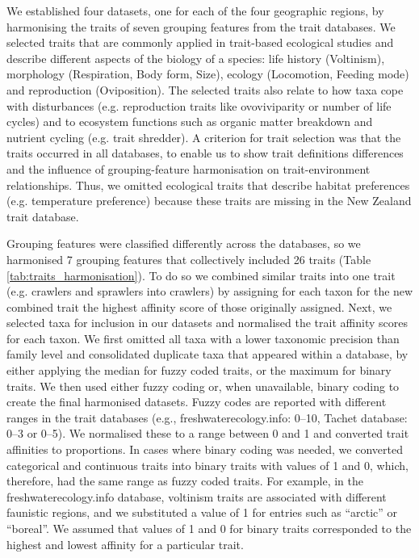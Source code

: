 \documentclass[12pt]{article}
\begin{document}
We established four datasets, one for each of the four geographic regions, by harmonising the traits of seven grouping features from the trait databases. We selected traits that are commonly applied in trait-based ecological studies and describe different aspects of the biology of a species: life history (Voltinism), morphology (Respiration, Body form, Size), ecology (Locomotion, Feeding mode) and reproduction (Oviposition). The selected traits also relate to how taxa cope with disturbances (e.g. reproduction traits like ovoviviparity or number of life cycles) and to ecosystem functions such as organic matter breakdown and nutrient cycling (e.g. trait shredder). A criterion for trait selection was that the traits occurred in all databases, to enable us to show trait definitions differences and the influence of grouping-feature harmonisation on trait-environment relationships. Thus, we omitted ecological traits that describe habitat preferences (e.g. temperature preference) because these traits are missing in the New Zealand trait database.

Grouping features were classified differently across the databases, so we harmonised 7 grouping features that collectively included 26 traits (Table \ref{tab:traits_harmonisation}). To do so we combined similar traits into one trait (e.g. crawlers and sprawlers into crawlers) by assigning for each taxon for the new combined trait the highest affinity score of those originally assigned. Next, we selected taxa for inclusion in our datasets and normalised the trait affinity scores for each taxon. We first omitted all taxa with a lower taxonomic precision than family level and consolidated duplicate taxa that appeared within a database, by either applying the median for fuzzy coded traits, or the maximum for binary traits. We then used either fuzzy coding or, when unavailable, binary coding to create the final harmonised datasets. Fuzzy codes are reported with different ranges in the trait databases (e.g., freshwaterecology.info: 0–10, Tachet database: 0–3 or 0–5). We normalised these to a range between 0 and 1 and converted trait affinities to proportions. In cases where binary coding was needed, we converted categorical and continuous traits into binary traits with values of 1 and 0, which, therefore, had the same range as fuzzy coded traits. For example, in the  freshwaterecology.info database, voltinism traits are associated with different faunistic regions, and we substituted a value of 1 for entries such as “arctic” or “boreal”. We assumed that values of 1 and 0 for binary traits corresponded to the highest and lowest affinity for a particular trait.
\end{document}
